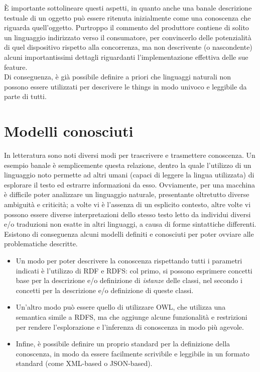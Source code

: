\documentclass[12pt,a4paper,openright,oneside]{report}
\begin{document}
È importante sottolineare questi aspetti, in quanto anche una banale descrizione testuale di un oggetto può essere ritenuta inizialmente come una conoscenza che riguarda quell'oggetto. Purtroppo il commento del produttore contiene di solito un linguaggio indirizzato verso il consumatore, per convincerlo delle potenzialità di quel dispositivo rispetto alla concorrenza, ma non descrivente (o nascondente) alcuni importantissimi dettagli riguardanti l'implementazione effettiva delle sue feature.\\

Di conseguenza, è già possibile definire a priori che linguaggi naturali non possono essere utilizzati per descrivere le things in modo univoco e leggibile da parte di tutti.

\section{Modelli conosciuti}
In letteratura sono noti diversi modi per trascrivere e trasmettere conoscenza. Un esempio banale è semplicemente questa relazione, dentro la quale l'utilizzo di un linguaggio noto permette ad altri umani (capaci di leggere la lingua utilizzata) di esplorare il testo ed estrarre informazioni da esso. Ovviamente, per una macchina è difficile poter analizzare un linguaggio naturale, presentante oltretutto diverse ambiguità e criticità; a volte vi è l'assenza di un esplicito contesto, altre volte vi possono essere diverse interpretazioni dello stesso testo letto da individui diversi e/o traduzioni non esatte in altri linguaggi, a causa di forme sintattiche differenti.\\

Esistono di conseguenza alcuni modelli definiti e conosciuti per poter ovviare alle problematiche descritte. 

\begin{itemize}
	\item Un modo per poter descrivere la conoscenza rispettando tutti i parametri indicati è l'utilizzo di RDF e RDFS: col primo, si possono esprimere concetti base per la descrizione e/o definizione di \textit{istanze} delle classi, nel secondo i concetti per la descrizione e/o definizione di queste classi.
	
	\item Un'altro modo può essere quello di utilizzare OWL, che utilizza una semantica simile a RDFS, ma che aggiunge alcune funzionalità e restrizioni per rendere l'esplorazione e l'inferenza di conoscenza in modo più agevole.
	
	\item Infine, è possibile definire un proprio standard per la definizione della conoscenza, in modo da essere facilmente scrivibile e leggibile in un formato standard (come XML-based o JSON-based).
\end{itemize}
\end{document}
